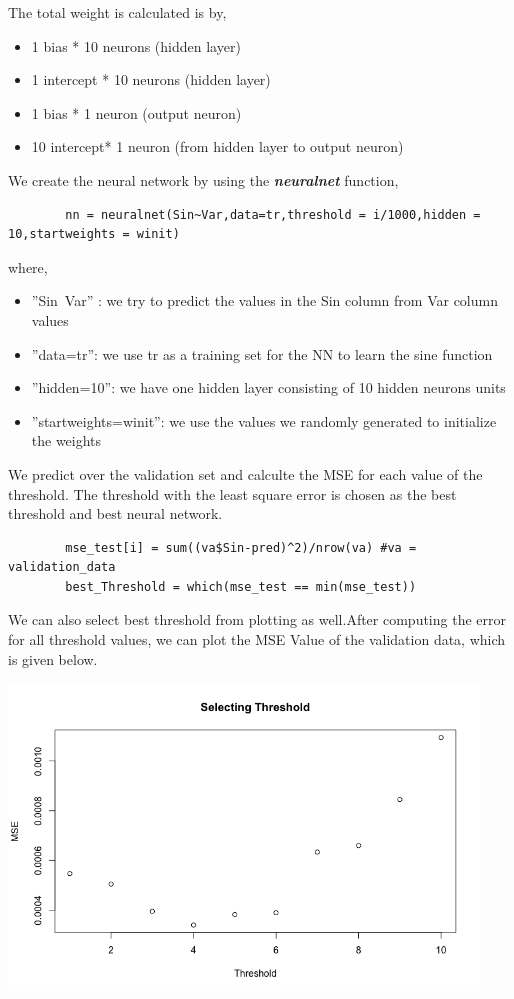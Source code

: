 \documentclass[a4paper,10pt]{article}
\begin{document}
The total weight is calculated is by,
\begin{itemize}
    \item 1 bias * 10 neurons (hidden layer)
    \item 1 intercept * 10 neurons (hidden layer)
    \item 1 bias * 1 neuron (output neuron)
    \item 10 intercept* 1 neuron (from hidden layer to output neuron)
\end{itemize} \par
We create the neural network by using the \textbf{\textit{neuralnet}} function, 
\begin{center}
    \begin{lstlisting}
        nn = neuralnet(Sin~Var,data=tr,threshold = i/1000,hidden = 10,startweights = winit)
    \end{lstlisting}
\end{center}
where,
\begin{itemize}
    \item ”Sin~Var” : we try to predict the values in the Sin column from Var column values
    \item ”data=tr”: we use tr as a training set for the NN to learn the sine function
    \item ”hidden=10”: we have one hidden layer consisting of 10 hidden neurons units
    \item ”startweights=winit”: we use the values we randomly generated to initialize the weights
\end{itemize}
We predict over the validation set and calculte the MSE for each value of the threshold. 
The threshold with the least square error is chosen as the best threshold and best neural network. \par
\begin{center}
    \begin{lstlisting}
        mse_test[i] = sum((va$Sin-pred)^2)/nrow(va) #va = validation_data
        best_Threshold = which(mse_test == min(mse_test))
    \end{lstlisting}
\end{center}
We can also select best threshold from plotting as well.After computing the error for all threshold values, 
we can plot the MSE Value of the validation data, which is given below.
\begin{center}
    \includegraphics[width=125mm,scale=0.10]{Thresold_plot.png} 
\end{center} \par
\end{document}
